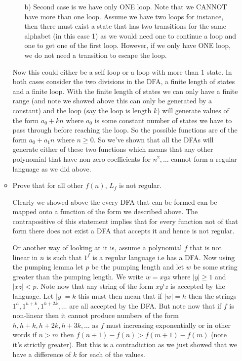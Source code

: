 \documentclass[11pt]{article}
\begin{document}
\begin{enumerate}
\begin{itemize}
\begin{answer}
\begin{enumerate}
    \item[b)] Second case is we have only ONE loop. Note that we CANNOT have more than one loop. Assume we have two loops for instance, then there must exist a state that has two transitions for the same alphabet (in this case 1) as we would need one to continue a loop and one to get one of the first loop. However, if we only have ONE loop, we do not need a transition to escape the loop.
    \vspace{1em}

        
\end{enumerate}

    Now this could either be a self loop or a loop with more than 1 state. In both cases consider the two divisions in the DFA, a finite length of states and a finite loop. With the finite length of states we can only have a finite range (and note we showed above this can only be generated by a constant) and the loop (say the loop is length $k$) will generate values of the form $a_{0} + kn$ where $a_{0}$ is some constant number of states we have to pass through before reaching the loop. So the possible functions are of the form $a_{0} + a_{1}n$ where $n \ge 0$. So we've shown that all the DFAs will generate  either of these two functions which means that any other polynomial that have non-zero coefficients for $n^2, \dots$ cannot form a regular language as we did above.
    

        \end{answer}
        \item Prove that for all other $f(n)$, $L_f$ is not regular.

        \begin{answer}
            Clearly we showed above the every DFA that can be formed can be mapped onto a function of the form we described above. The contrapositive of this statement implies that for every function not of that form there does not exist a DFA that accepts it and hence is not regular.

            \vspace{1em}
            Or another way of looking at it is, assume a polynomial $f$  that is not linear in $n$ is such that $1^{f}$ is a regular language i.e has a DFA. Now using the pumping lemma let $p$ be the pumping length and let $w$ be some string greater than the pumping  length. We write $w = xyz$ where $|y| \ge 1$ and $|xz| < p$. Note now that any string of the form $xy^{i}z$ is accepted by the language. Let $|y| = k$ this must then mean that if $|w| = h$ then the strings $1^{h}, 1^{h + k}, 1^{h + 2k}, \dots$ are all accepted by the DFA. But note now that if $f$ is non-linear then it cannot produce numbers of the form $h, h + k, h + 2k, h + 3k, \dots$ as $f$ must increasing exponentially or in other words if $n > m$ then $f(n + 1) - f(n) > f(m + 1) - f(m)$ (note it's strictly greater). But this is a contradiction as we just showed that we have a difference of $k$ for each of the values.
        \end{answer}
    \end{itemize}
\end{enumerate}
\end{document}

